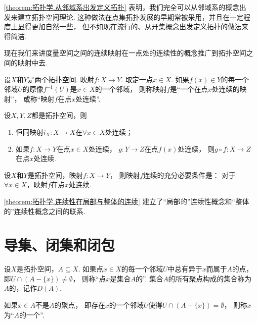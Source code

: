 \cref{theorem:拓扑学.从邻域系出发定义拓扑}
表明，我们完全可以从邻域系的概念出发来建立拓扑空间理论.
这种做法在点集拓扑发展的早期常被采用，并且在一定程度上显得更加自然一些，
但不如现在流行的、从开集概念出发定义拓扑的做法来得简洁.

现在我们来讲度量空间之间的连续映射在一点处的连续性的概念推广到拓扑空间之间的映射中去.

\begin{definition}
设\(X\)和\(Y\)是两个拓扑空间.
映射\(f\colon X \to Y\).
取定一点\(x \in X\).
如果\(f(x) \in Y\)的每一个邻域\(U\)的原像\(f^{-1}(U)\)是\(x \in X\)的一个邻域，
则称映射\(f\)是“一个在点\(x\)处连续的映射”，
或称“映射\(f\)在点\(x\)处连续”.
\end{definition}

\begin{theorem}
设\(X,Y,Z\)都是拓扑空间，则
\begin{enumerate}
	\item 恒同映射\(i_X\colon X \to X\)在\(\forall x \in X\)处连续；
	\item 如果\(f\colon X \to Y\)在点\(x \in X\)处连续，
	\(g\colon Y \to Z\)在点\(f(x)\)处连续，
	则\(g \circ f\colon X \to Z\)在点\(x\)处连续.
\end{enumerate}
\end{theorem}

\begin{theorem}\label{theorem:拓扑学.连续性在局部与整体的连续}
设\(X\)和\(Y\)是拓扑空间，映射\(f\colon X \to Y\)，
则映射\(f\)连续的充分必要条件是：
对于\(\forall x \in X\)，映射\(f\)在点\(x\)处连续.
\end{theorem}

\cref{theorem:拓扑学.连续性在局部与整体的连续}
建立了“局部的”连续性概念和“整体的”连续性概念之间的联系.

\section{导集、闭集和闭包}
\begin{definition}\label{definition:拓扑学.聚点与孤立点的概念}
设\(X\)是拓扑空间，\(A \subseteq X\).
如果点\(x \in X\)的每一个邻域\(U\)中总有异于\(x\)而属于\(A\)的点，
即\(U \cap (A - \{x\}) \neq \emptyset\)，
则称“点\(x\)是集合\(A\)的”.
集合\(A\)的所有聚点构成的集合称为\(A\)的，记作\(D(A)\).

如果\(x \in A\)不是\(A\)的聚点，
即存在\(x\)的一个邻域\(U\)使得\(U \cap (A - \{x\}) = \emptyset\)，
则称\(x\)为“\(A\)的一个”.
\end{definition}

